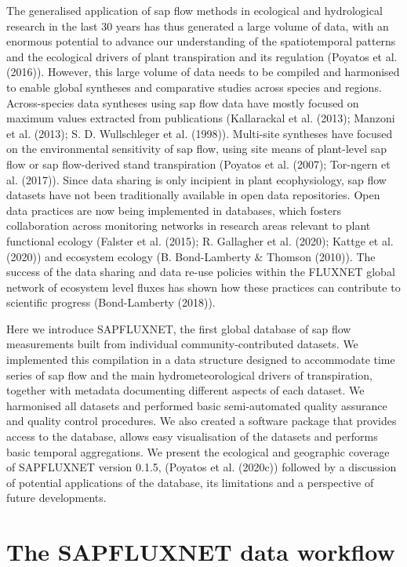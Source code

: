 \documentclass[11pt,twoside]{reedthesis}
\begin{document}
The generalised application of sap flow methods in ecological and
hydrological research in the last 30 years has thus generated a large
volume of data, with an enormous potential to advance our understanding
of the spatiotemporal patterns and the ecological drivers of plant
transpiration and its regulation (Poyatos et al. (2016)). However, this
large volume of data needs to be compiled and harmonised to enable
global syntheses and comparative studies across species and regions.
Across-species data syntheses using sap flow data have mostly focused on
maximum values extracted from publications (Kallarackal et al. (2013);
Manzoni et al. (2013); S. D. Wullschleger et al. (1998)). Multi-site
syntheses have focused on the environmental sensitivity of sap flow,
using site means of plant-level sap flow or sap flow-derived stand
transpiration (Poyatos et al. (2007); Tor-ngern et al. (2017)). Since
data sharing is only incipient in plant ecophysiology, sap flow datasets
have not been traditionally available in open data repositories. Open
data practices are now being implemented in databases, which fosters
collaboration across monitoring networks in research areas relevant to
plant functional ecology (Falster et al. (2015); R. Gallagher et al.
(2020); Kattge et al. (2020)) and ecosystem ecology (B. Bond-Lamberty \&
Thomson (2010)). The success of the data sharing and data re-use
policies within the FLUXNET global network of ecosystem level fluxes has
shown how these practices can contribute to scientific progress
(Bond-Lamberty (2018)).\par

Here we introduce SAPFLUXNET, the first global database of sap flow
measurements built from individual community-contributed datasets. We
implemented this compilation in a data structure designed to accommodate
time series of sap flow and the main hydrometeorological drivers of
transpiration, together with metadata documenting different aspects of
each dataset. We harmonised all datasets and performed basic
semi-automated quality assurance and quality control procedures. We also
created a software package that provides access to the database, allows
easy visualisation of the datasets and performs basic temporal
aggregations. We present the ecological and geographic coverage of
SAPFLUXNET version 0.1.5, (Poyatos et al. (2020c)) followed by a
discussion of potential applications of the database, its limitations
and a perspective of future developments. \par

\section{The SAPFLUXNET data
workflow}\label{the-sapfluxnet-data-workflow}
\end{document}
